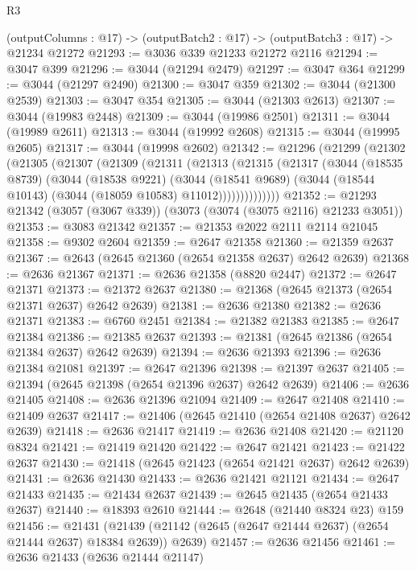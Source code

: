 \begin{lexlean}{R3}
\begin{coremodule}
  (outputColumns : @17) -> (outputBatch2 : @17) -> (outputBatch3 : @17) -> @21234 @21272
@21293 := @3036 @339 @21233 @21272 @2116
@21294 := @3047 @399
@21296 := @3044 (@21294 @2479)
@21297 := @3047 @364
@21299 := @3044 (@21297 @2490)
@21300 := @3047 @359
@21302 := @3044 (@21300 @2539)
@21303 := @3047 @354
@21305 := @3044 (@21303 @2613)
@21307 := @3044 (@19983 @2448)
@21309 := @3044 (@19986 @2501)
@21311 := @3044 (@19989 @2611)
@21313 := @3044 (@19992 @2608)
@21315 := @3044 (@19995 @2605)
@21317 := @3044 (@19998 @2602)
@21342 := @21296
    (@21299
      (@21302
        (@21305
          (@21307
            (@21309
              (@21311
                (@21313
                  (@21315
                    (@21317
                      (@3044
                        (@18535 @8739)
                        (@3044
                          (@18538 @9221)
                          (@3044
                            (@18541 @9689)
                            (@3044 (@18544 @10143) (@3044 (@18059 @10583) @11012))))))))))))))
@21352 := @21293 @21342 (@3057 (@3067 @339)) (@3073 (@3074 (@3075 @2116) @21233 @3051))
@21353 := @3083 @21342
@21357 := @21353 @2022 @2111 @2114 @21045
@21358 := @9302 @2604
@21359 := @2647 @21358
@21360 := @21359 @2637
@21367 := @2643 (@2645 @21360 (@2654 @21358 @2637) @2642 @2639)
@21368 := @2636 @21367
@21371 := @2636 @21358 (@8820 @2447)
@21372 := @2647 @21371
@21373 := @21372 @2637
@21380 := @21368 (@2645 @21373 (@2654 @21371 @2637) @2642 @2639)
@21381 := @2636 @21380
@21382 := @2636 @21371
@21383 := @6760 @2451
@21384 := @21382 @21383
@21385 := @2647 @21384
@21386 := @21385 @2637
@21393 := @21381 (@2645 @21386 (@2654 @21384 @2637) @2642 @2639)
@21394 := @2636 @21393
@21396 := @2636 @21384 @21081
@21397 := @2647 @21396
@21398 := @21397 @2637
@21405 := @21394 (@2645 @21398 (@2654 @21396 @2637) @2642 @2639)
@21406 := @2636 @21405
@21408 := @2636 @21396 @21094
@21409 := @2647 @21408
@21410 := @21409 @2637
@21417 := @21406 (@2645 @21410 (@2654 @21408 @2637) @2642 @2639)
@21418 := @2636 @21417
@21419 := @2636 @21408
@21420 := @21120 @8324
@21421 := @21419 @21420
@21422 := @2647 @21421
@21423 := @21422 @2637
@21430 := @21418 (@2645 @21423 (@2654 @21421 @2637) @2642 @2639)
@21431 := @2636 @21430
@21433 := @2636 @21421 @21121
@21434 := @2647 @21433
@21435 := @21434 @2637
@21439 := @2645 @21435 (@2654 @21433 @2637)
@21440 := @18393 @2610
@21444 := @2648 (@21440 @8324 @23) @159
@21456 := @21431
    (@21439 (@21142 (@2645 (@2647 @21444 @2637) (@2654 @21444 @2637) @18384 @2639)) @2639)
@21457 := @2636 @21456
@21461 := @2636 @21433 (@2636 @21444 @21147)

\end{coremodule}
\end{lexlean}
